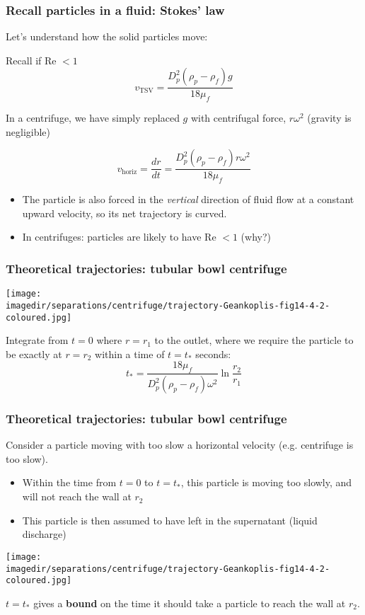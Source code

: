 \begin{frame}\frametitle{Recall particles in a fluid: Stokes' law}
	Let's understand how the solid particles move:
	\begin{exampleblock}{Recall  if Re $< 1$}
		\[
			v_\text{TSV} = \frac{D_p^2 \left( \rho_p - \rho_f \right) g }{18 \mu_f} \label{TSV-low-Re}
		\]
	\end{exampleblock}
	In a centrifuge, we have simply replaced $g$ with centrifugal force, $r \omega^2$ (gravity is negligible)
	\begin{exampleblock}{}
		\[
			v_\text{horiz} = \frac{dr}{dt} = \frac{D_p^2\left(\rho_p - \rho_f\right)r\omega^2}{18 \mu_f}
		\]
	\end{exampleblock}
	\begin{itemize}
		\item	The particle is also forced in the \emph{vertical} direction of fluid flow at a constant upward velocity, so its net trajectory is curved.
		\item	In centrifuges: particles are likely to have Re $< 1$ (why?)
	\end{itemize}
\end{frame}

\begin{frame}\frametitle{Theoretical trajectories: tubular bowl centrifuge}
	\begin{center}
		\texttt{[image: \\imagedir/separations/centrifuge/trajectory-Geankoplis-fig14-4-2-coloured.jpg]}
	\end{center}
	Integrate from $t=0$ where $r=r_1$ to the outlet, where we require the particle to be exactly at $r=r_2$ within a time of $t=t_*$ seconds:
	\[
		t_* = \frac{18 \mu_f}{D_p^2\left(\rho_p - \rho_f\right)\omega^2} \ln \frac{r_2}{r_1}
	\]
\end{frame}

\begin{frame}\frametitle{Theoretical trajectories: tubular bowl centrifuge}
	Consider a particle moving with too slow a horizontal velocity (e.g. centrifuge is too slow).
	\begin{itemize}
		\item	Within the time from $t=0$ to $t=t_*$, this particle is moving too slowly, and will not reach the wall at $r_2$ 
		\item	This particle is then assumed to have left in the supernatant (liquid discharge)
	\end{itemize}
	\begin{center}
		\texttt{[image: \\imagedir/separations/centrifuge/trajectory-Geankoplis-fig14-4-2-coloured.jpg]}
	\end{center}
	$t=t_*$ gives a \textbf{bound} on the time it should take a particle to reach the wall at $r_2$.
\end{frame}

